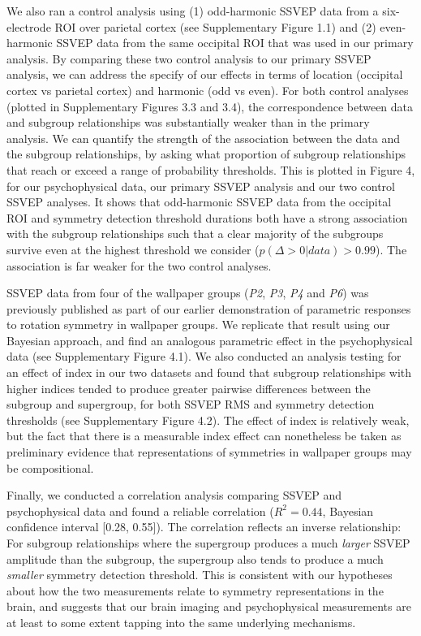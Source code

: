\documentclass[11pt, twoside]{article}
\begin{document}
We also ran a control analysis using (1) odd-harmonic SSVEP data from a six-electrode ROI over parietal cortex (see Supplementary Figure 1.1) and (2) even-harmonic SSVEP data from the same occipital ROI that was used in our primary analysis. By comparing these two control analysis to our primary SSVEP analysis, we can address the specify of our effects in terms of location (occipital cortex vs parietal cortex) and harmonic (odd vs even). For both control analyses (plotted in Supplementary Figures 3.3 and 3.4), the correspondence between data and subgroup relationships was substantially weaker than in the primary analysis. We can quantify the strength of the association between the data and the subgroup relationships, by asking what proportion of subgroup relationships that reach or exceed a range of probability thresholds. This is plotted in Figure 4, for our psychophysical data, our primary SSVEP analysis and our two control SSVEP analyses. It shows that odd-harmonic SSVEP data from the occipital ROI and symmetry detection threshold durations both have a strong association with the subgroup relationships such that a clear majority of the subgroups survive even at the highest threshold we consider ($p(\Delta>0|data)>0.99$). The association is far weaker for the two control analyses.

SSVEP data from four of the wallpaper groups (\textit{P2}, \textit{P3}, \textit{P4} and \textit{P6}) was previously published as part of our earlier demonstration of parametric responses to rotation symmetry in wallpaper groups\citep{RN1725}. We replicate that result using our Bayesian approach, and find an analogous parametric effect in the psychophysical data (see Supplementary Figure 4.1). We also conducted an analysis testing for an effect of index in our two datasets and found that subgroup relationships with higher indices tended to produce greater pairwise differences between the subgroup and supergroup, for both SSVEP RMS and symmetry detection thresholds (see Supplementary Figure 4.2). The effect of index is relatively weak, but the fact that there is a measurable index effect can nonetheless be taken as preliminary evidence that representations of symmetries in wallpaper groups may be compositional.

Finally, we conducted a correlation analysis comparing SSVEP and psychophysical data and found a reliable correlation ($R^2 = 0.44$, Bayesian confidence interval [0.28, 0.55]). The correlation reflects an inverse relationship: For subgroup relationships where the supergroup produces a much \textit{larger} SSVEP amplitude than the subgroup, the supergroup also tends to produce a much \textit{smaller} symmetry detection threshold. This is consistent with our hypotheses about how the two measurements relate to symmetry representations in the brain, and suggests that our brain imaging and psychophysical measurements are at least to some extent tapping into the same underlying mechanisms.
\end{document}
